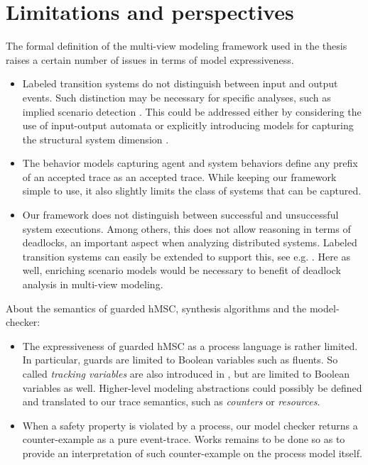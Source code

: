 \section{Limitations and perspectives\label{section:conclusion-limitations}}

The formal definition of the multi-view modeling framework used in the thesis raises a certain number of issues in terms of model expressiveness.
\begin{itemize}

\item Labeled transition systems do not distinguish between input and output events. Such distinction may be necessary for specific analyses, such as implied scenario detection \cite{Letier:2005b}. This could be addressed either by considering the use of input-output automata \cite{Lynch:1987} or explicitly introducing models for capturing the structural system dimension \cite{Jackson:1995, Magee:1995}.

\item The behavior models capturing agent and system behaviors define any prefix of an accepted trace as an accepted trace. While keeping our framework simple to use, it also slightly limits the class of systems that can be captured.

\item Our framework does not distinguish between successful and unsuccessful system executions. Among others, this does not allow reasoning in terms of deadlocks, an important aspect when analyzing distributed systems. Labeled transition systems can easily be extended to support this, see e.g. \cite{Uchitel:2003}. Here as well, enriching scenario models would be necessary to benefit of deadlock analysis in multi-view modeling.

\end{itemize}

About the semantics of guarded hMSC, synthesis algorithms and the model-checker:
\begin{itemize}

\item The expressiveness of guarded hMSC as a process language is rather limited. In particular, guards are limited to Boolean variables such as fluents. So called \emph{tracking  variables} are also introduced in \cite{Damas:2011}, but are limited to Boolean variables as well. Higher-level modeling abstractions could possibly be defined and translated to our trace semantics, such as \emph{counters} or \emph{resources}.

\item When a safety property is violated by a process, our model checker returns a counter-example as a pure event-trace. Works remains to be done so as to provide an interpretation of such counter-example on the process model itself. 
\end{itemize}

